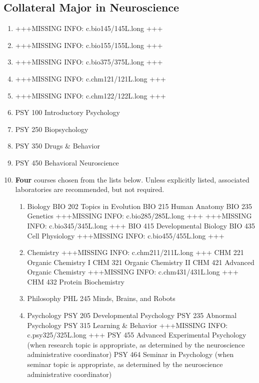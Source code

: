 \documentclass[
  letterpaper,
]{scrbook}
\providecommand{\tightlist}{%
  \setlength{\itemsep}{0pt}\setlength{\parskip}{0pt}}
\begin{document}
\hypertarget{collateral-major-in-neuroscience}{%
\subsection{Collateral Major in
Neuroscience}\label{collateral-major-in-neuroscience}}

\begin{enumerate}
\def\labelenumi{\arabic{enumi}.}
\tightlist
\item
  +++MISSING INFO: c.bio145/145L.long +++
\item
  +++MISSING INFO: c.bio155/155L.long +++
\item
  +++MISSING INFO: c.bio375/375L.long +++
\item
  +++MISSING INFO: c.chm121/121L.long +++
\item
  +++MISSING INFO: c.chm122/122L.long +++
\item
  PSY 100 Introductory Psychology
\item
  PSY 250 Biopsychology
\item
  PSY 350 Drugs \& Behavior
\item
  PSY 450 Behavioral Neuroscience
\item
  \textbf{Four} courses chosen from the lists below. Unless explicitly
  listed, associated laboratories are recommended, but not required.

  \begin{enumerate}
  \def\labelenumii{\alph{enumii}.}
  \tightlist
  \item
    Biology BIO 202 Topics in Evolution BIO 215 Human Anatomy BIO 235
    Genetics +++MISSING INFO: c.bio285/285L.long +++ +++MISSING INFO:
    c.bio345/345L.long +++ BIO 415 Developmental Biology BIO 435 Cell
    Physiology +++MISSING INFO: c.bio455/455L.long +++
  \item
    Chemistry +++MISSING INFO: c.chm211/211L.long +++ CHM 221 Organic
    Chemistry I CHM 321 Organic Chemistry II CHM 421 Advanced Organic
    Chemistry +++MISSING INFO: c.chm431/431L.long +++ CHM 432 Protein
    Biochemistry
  \item
    Philosophy PHL 245 Minds, Brains, and Robots
  \item
    Psychology PSY 205 Developmental Psychology PSY 235 Abnormal
    Psychology PSY 315 Learning \& Behavior +++MISSING INFO:
    c.psy325/325L.long +++ PSY 455 Advanced Experimental Psychology
    (when research topic is appropriate, as determined by the
    neuroscience administrative coordinator) PSY 464 Seminar in
    Psychology (when seminar topic is appropriate, as determined by the
    neuroscience administrative coordinator)
  \end{enumerate}
\end{enumerate}
\end{document}
